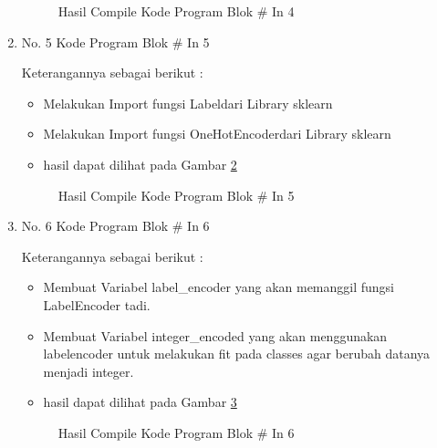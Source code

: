 \begin{enumerate}
\begin{figure}[!htbp]
      \caption{Hasil Compile Kode Program Blok \# In 4}
      \label{refer15}
\end{figure}

\item No. 5 Kode Program Blok \# In 5
\par 
Keterangannya sebagai berikut :
\begin{itemize}
\item Melakukan Import fungsi Labeldari Library sklearn 
\item Melakukan Import fungsi OneHotEncoderdari Library sklearn
\item hasil dapat dilihat pada Gambar \ref{refer16}
\end{itemize}

\begin{figure}[!htbp]
      \caption{Hasil Compile Kode Program Blok \# In 5}
      \label{refer16}
\end{figure}

\item No. 6 Kode Program Blok \# In 6
\par 
Keterangannya sebagai berikut :
\begin{itemize}
\item Membuat Variabel label\_encoder yang akan memanggil fungsi LabelEncoder tadi.
\item Membuat Variabel integer\_encoded yang akan menggunakan labelencoder untuk melakukan fit pada classes agar berubah datanya menjadi integer.
\item hasil dapat dilihat pada Gambar \ref{refer17}
\end{itemize}

\begin{figure}[!htbp]
      \caption{Hasil Compile Kode Program Blok \# In 6}
      \label{refer17}
\end{figure}


\end{enumerate}
